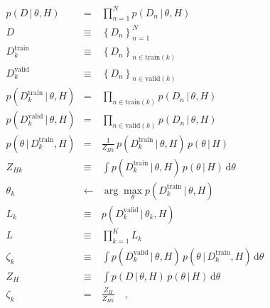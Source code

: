 \documentclass[12pt]{article}
\newcommand{\given}{\,|\,}
\newcommand{\setof}[1]{\left\{{#1}\right\}}
\newcommand{\train}{\mathrm{train}}
\newcommand{\valid}{\mathrm{valid}}
\newcommand{\dd}{\mathrm{d}}
\begin{document}
\begin{eqnarray}
p(D\given\theta,H) &=& \prod_{n=1}^N p(D_n\given\theta,H)
\\
D &\equiv& \setof{D_n}_{n=1}^N
\\
D^\train_k &\equiv& \setof{D_n}_{n\in\train(k)}
\\
D^\valid_k &\equiv& \setof{D_n}_{n\in\valid(k)}
\\
p(D^\train_k\given\theta,H) &=& \prod_{n\in\train(k)} p(D_n\given\theta,H)
\\
p(D^\valid_k\given\theta,H) &=& \prod_{n\in\valid(k)} p(D_n\given\theta,H)
\\
p(\theta\given D^\train_k,H) &=& \frac{1}{Z_{Hk}}\,p(D^\train_k\given\theta,H)\,p(\theta\given H)
\\
Z_{Hk} &\equiv& \int p(D^\train_k\given\theta,H)\,p(\theta\given H)\,\dd\theta
\\
\theta_k &\leftarrow& \arg\max_\theta p(D^\train_k\given\theta,H)
\\
L_k &\equiv& p(D^\valid_k\given\theta_k,H)
\\
L &\equiv& \prod_{k=1}^K L_k
\\
\zeta_k &\equiv& \int p(D^\valid_k\given\theta,H)\,p(\theta\given D^\train_k,H)\,\dd\theta
\\
Z_H &\equiv& \int p(D\given\theta,H)\,p(\theta\given H)\,\dd\theta
\\
\zeta_k &=& \frac{Z_H}{Z_{Hk}}
\quad,
\end{eqnarray}
\end{document}
